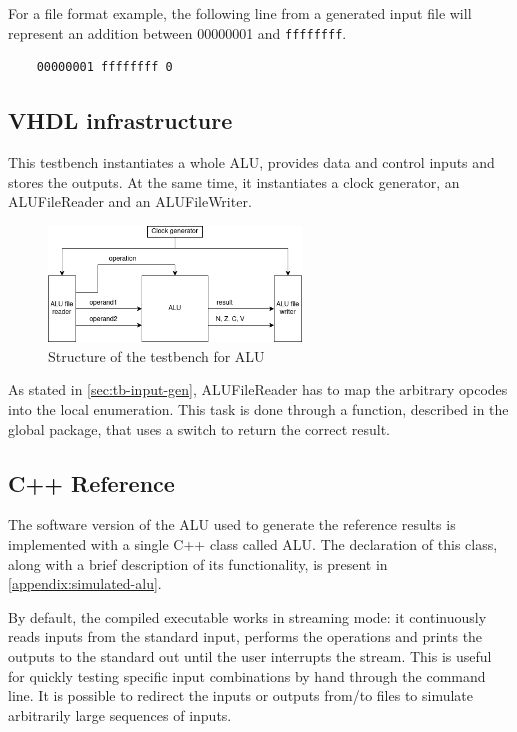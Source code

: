 For a file format example, the following line from a generated input file will represent
an addition between 00000001 and \texttt{ffffffff}.
\begin{lstlisting}
    00000001 ffffffff 0
\end{lstlisting}

\subsection{VHDL infrastructure}
This testbench instantiates a whole ALU, provides data and control inputs and stores the outputs. At the same time, it
instantiates a clock generator, an ALUFileReader and an ALUFileWriter.

\begin{figure}[htbp]
    \center
	\includegraphics[width=0.6\textwidth]{./3-verification/images/tb_ALU.png}
	\caption{Structure of the testbench for ALU}
	\label{fig:tb-alu}
\end{figure}

As stated in \autoref{sec:tb-input-gen}, ALUFileReader has to map the arbitrary opcodes into the local enumeration.
This task is done through a function, described in the global package, that uses a switch to return the correct result.

\subsection{C++ Reference}
The software version of the ALU used to generate the reference results is implemented with a single C++ class called
ALU. The declaration of this class, along with a brief description of its functionality,
is present in \autoref{appendix:simulated-alu}.

By default, the compiled executable works in streaming mode: it continuously reads inputs from the standard input,
performs the operations and prints the outputs to the standard out until the user interrupts the stream. This is useful
for quickly testing specific input combinations by hand through the command line. It is possible to redirect the inputs
or outputs from/to files to simulate arbitrarily large sequences of inputs.

